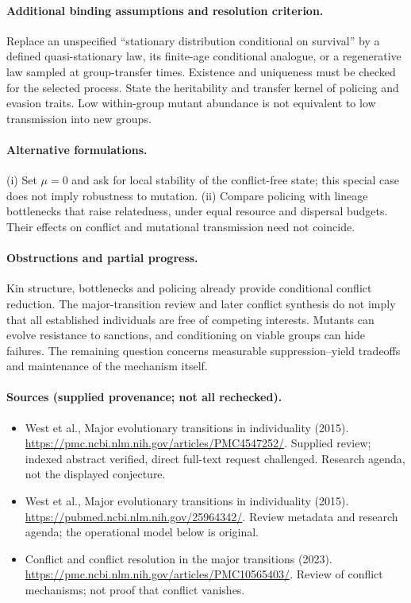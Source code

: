 \documentclass[11pt]{article}
\begin{document}
\paragraph{Additional binding assumptions and resolution criterion.} Replace an unspecified ``stationary distribution conditional on survival'' by a defined quasi-stationary law, its finite-age conditional analogue, or a regenerative law sampled at group-transfer times. Existence and uniqueness must be checked for the selected process. State the heritability and transfer kernel of policing and evasion traits. Low within-group mutant abundance is not equivalent to low transmission into new groups.

\paragraph{Alternative formulations.} (i) Set $\mu=0$ and ask for local stability of the conflict-free state; this special case does not imply robustness to mutation. (ii) Compare policing with lineage bottlenecks that raise relatedness, under equal resource and dispersal budgets. Their effects on conflict and mutational transmission need not coincide.
\paragraph{Obstructions and partial progress.} Kin structure, bottlenecks and policing already provide conditional conflict reduction. The major-transition review and later conflict synthesis do not imply that all established individuals are free of competing interests. Mutants can evolve resistance to sanctions, and conditioning on viable groups can hide failures. The remaining question concerns measurable suppression--yield tradeoffs and maintenance of the mechanism itself.
\paragraph{Sources (supplied provenance; not all rechecked).}
\begin{itemize}
\item West et al., Major evolutionary transitions in individuality (2015). \url{https://pmc.ncbi.nlm.nih.gov/articles/PMC4547252/}. Supplied review; indexed abstract verified, direct full-text request challenged. Research agenda, not the displayed conjecture.
\item West et al., Major evolutionary transitions in individuality (2015). \url{https://pubmed.ncbi.nlm.nih.gov/25964342/}. Review metadata and research agenda; the operational model below is original.
\item Conflict and conflict resolution in the major transitions (2023). \url{https://pmc.ncbi.nlm.nih.gov/articles/PMC10565403/}. Review of conflict mechanisms; not proof that conflict vanishes.
\end{itemize}
\end{document}
